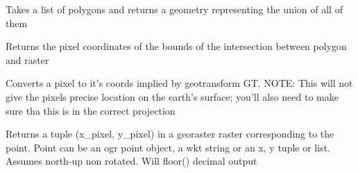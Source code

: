 \documentclass[letterpaper,10pt,english]{sphinxmanual}
\begin{document}

\begin{fulllineitems}
\label{\detokenize{index:pyeo.coordinate_manipulation.multiple_union}}
Takes a list of polygons and returns a geometry representing the union of all of them

\end{fulllineitems}


\begin{fulllineitems}
\label{\detokenize{index:pyeo.coordinate_manipulation.pixel_bounds_from_polygon}}
Returns the pixel coordinates of the bounds of the
intersection between polygon and raster

\end{fulllineitems}


\begin{fulllineitems}
\label{\detokenize{index:pyeo.coordinate_manipulation.pixel_to_point_coordinates}}
Converts a pixel to it’s coords implied by geotransform GT.
NOTE: This will not give the pixels precise location on the earth’s surface;
you’ll also need to make sure tha this is in the correct projection

\end{fulllineitems}


\begin{fulllineitems}
\label{\detokenize{index:pyeo.coordinate_manipulation.point_to_pixel_coordinates}}
Returns a tuple (x\_pixel, y\_pixel) in a georaster raster corresponding to the point.
Point can be an ogr point object, a wkt string or an x, y tuple or list. Assumes north-up non rotated.
Will floor() decimal output

\end{fulllineitems}
\end{document}

